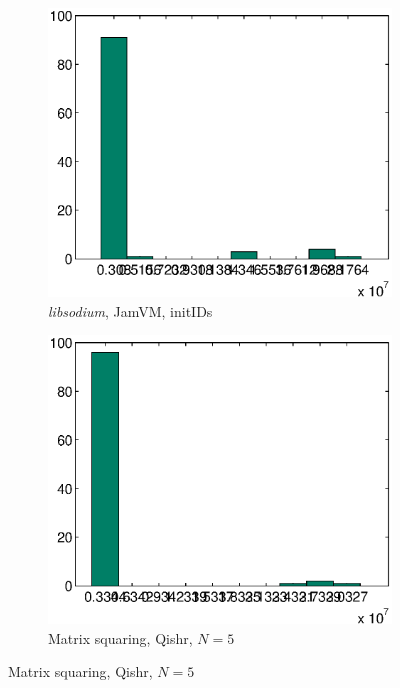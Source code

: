 \documentclass[a4paper,12pt,twoside,openright]{report}
\newcommand{\tool}[1]{\emph{#1}}
\newcommand{\lib}[1]{\tool{lib#1}}
\begin{document}
\begin{figure}[t]
	\centering
	\begin{subfigure}{0.45\textwidth}
		\centering
		\includegraphics[width=\textwidth]{10_sodium.eps}
		\caption{\lib{sodium}, JamVM, initIDs}
	\end{subfigure}
	\begin{subfigure}{0.45\textwidth}
		\centering
		\includegraphics[width=\textwidth]{10_matrix5.eps}
		\caption{Matrix squaring, Qishr, $N = 5$}
	\end{subfigure}

\end{figure}
\end{document}
